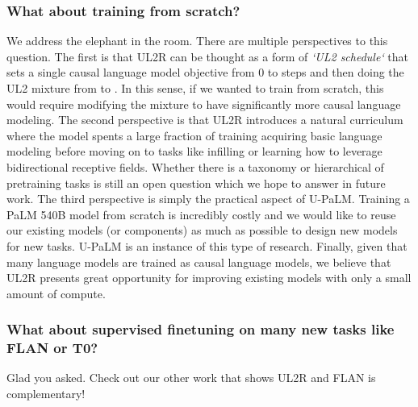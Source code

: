\documentclass{article}
\newcommand{\methodname}{UL2R\xspace}
\newcommand{\modelname}{U-PaLM\xspace}
\begin{document}
\subsubsection{What about training from scratch?}
We address the elephant in the room. There are multiple perspectives to this question. The first is that \methodname can be thought as a form of \textit{`UL2 schedule`} that sets a single causal language model objective from 0 to  steps and then doing the UL2 mixture from  to . In this sense, if we wanted to train from scratch, this would require modifying the mixture to have significantly more causal language modeling. The second perspective is that \methodname introduces a natural curriculum where the model spents a large fraction of training acquiring basic language modeling before moving on to tasks like infilling or learning how to leverage bidirectional receptive fields. Whether there is a taxonomy or hierarchical of pretraining tasks is still an open question which we hope to answer in future work. The third perspective is simply the practical aspect of \modelname. Training a PaLM 540B model from scratch is incredibly costly and we would like to reuse our existing models (or components) as much as possible to design new models for new tasks. \modelname is an instance of this type of research. Finally, given that many language models are trained as causal language models, we believe that \methodname presents great opportunity for improving existing models with only a small amount of compute.

\subsubsection{What about supervised finetuning on many new tasks like FLAN or T0?}
Glad you asked. Check out our other work \citep{chung2022flan} that shows \methodname and FLAN is complementary!
\end{document}
